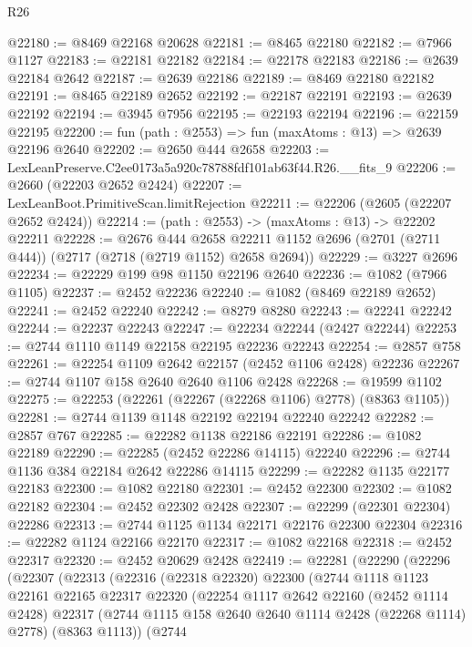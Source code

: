 \begin{lexlean}{R26}
\begin{coremodule}
@22180 := @8469 @22168 @20628
@22181 := @8465 @22180
@22182 := @7966 @1127
@22183 := @22181 @22182
@22184 := @22178 @22183
@22186 := @2639 @22184 @2642
@22187 := @2639 @22186
@22189 := @8469 @22180 @22182
@22191 := @8465 @22189 @2652
@22192 := @22187 @22191
@22193 := @2639 @22192
@22194 := @3945 @7956
@22195 := @22193 @22194
@22196 := @22159 @22195
@22200 := fun (path : @2553) => fun (maxAtoms : @13) => @2639 @22196 @2640
@22202 := @2650 @444 @2658
@22203 := LexLeanPreserve.C2ee0173a5a920c78788fdf101ab63f44.R26.__fits_9
@22206 := @2660 (@22203 @2652 @2424)
@22207 := LexLeanBoot.PrimitiveScan.limitRejection
@22211 := @22206 (@2605 (@22207 @2652 @2424))
@22214 := (path : @2553) -> (maxAtoms : @13) -> @22202 @22211
@22228 := @2676
    @444
    @2658
    @22211
    @1152
    @2696
    (@2701 (@2711 @444))
    (@2717 (@2718 (@2719 @1152) @2658 @2694))
@22229 := @3227 @2696
@22234 := @22229 @199 @98 @1150 @22196 @2640
@22236 := @1082 (@7966 @1105)
@22237 := @2452 @22236
@22240 := @1082 (@8469 @22189 @2652)
@22241 := @2452 @22240
@22242 := @8279 @8280
@22243 := @22241 @22242
@22244 := @22237 @22243
@22247 := @22234 @22244 (@2427 @22244)
@22253 := @2744 @1110 @1149 @22158 @22195 @22236 @22243
@22254 := @2857 @758
@22261 := @22254 @1109 @2642 @22157 (@2452 @1106 @2428) @22236
@22267 := @2744 @1107 @158 @2640 @2640 @1106 @2428
@22268 := @19599 @1102
@22275 := @22253 (@22261 (@22267 (@22268 @1106) @2778) (@8363 @1105))
@22281 := @2744 @1139 @1148 @22192 @22194 @22240 @22242
@22282 := @2857 @767
@22285 := @22282 @1138 @22186 @22191
@22286 := @1082 @22189
@22290 := @22285 (@2452 @22286 @14115) @22240
@22296 := @2744 @1136 @384 @22184 @2642 @22286 @14115
@22299 := @22282 @1135 @22177 @22183
@22300 := @1082 @22180
@22301 := @2452 @22300
@22302 := @1082 @22182
@22304 := @2452 @22302 @2428
@22307 := @22299 (@22301 @22304) @22286
@22313 := @2744 @1125 @1134 @22171 @22176 @22300 @22304
@22316 := @22282 @1124 @22166 @22170
@22317 := @1082 @22168
@22318 := @2452 @22317
@22320 := @2452 @20629 @2428
@22419 := @22281
    (@22290
      (@22296
        (@22307
          (@22313
            (@22316
              (@22318 @22320)
              @22300
              (@2744
                @1118
                @1123
                @22161
                @22165
                @22317
                @22320
                (@22254
                  @1117
                  @2642
                  @22160
                  (@2452 @1114 @2428)
                  @22317
                  (@2744 @1115 @158 @2640 @2640 @1114 @2428 (@22268 @1114) @2778)
                  (@8363 @1113))
                (@2744

\end{coremodule}
\end{lexlean}
